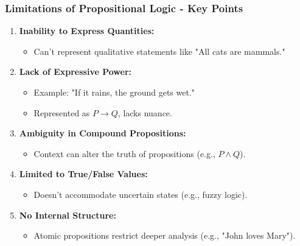\documentclass[aspectratio=169]{beamer}
\begin{document}
\begin{frame}[fragile]
    \frametitle{Limitations of Propositional Logic - Key Points}
    \begin{enumerate}
        \item \textbf{Inability to Express Quantities:}
            \begin{itemize}
                \item Can't represent qualitative statements like "All cats are mammals."
            \end{itemize}
        
        \item \textbf{Lack of Expressive Power:}
            \begin{itemize}
                \item Example: "If it rains, the ground gets wet." 
                \item Represented as \( P \rightarrow Q \), lacks nuance.
            \end{itemize}
        
        \item \textbf{Ambiguity in Compound Propositions:}
            \begin{itemize}
                \item Context can alter the truth of propositions (e.g., \( P \land Q \)).
            \end{itemize}
        
        \item \textbf{Limited to True/False Values:}
            \begin{itemize}
                \item Doesn't accommodate uncertain states (e.g., fuzzy logic).
            \end{itemize}
        
        \item \textbf{No Internal Structure:}
            \begin{itemize}
                \item Atomic propositions restrict deeper analysis (e.g., "John loves Mary").
            \end{itemize}
    \end{enumerate}
\end{frame}
\end{document}
